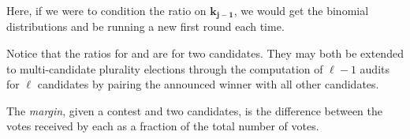 Here, if we were to condition the ratio on $\bm{k_{j-1}}$, we would get the binomial distributions and be running a new first round each time. 

Notice that the ratios for \BRAVO and \Minerva are for two candidates. They may both be extended to multi-candidate plurality elections through the computation of $\ell -1$ audits for $\ell$ candidates by pairing the announced winner with all other candidates. 

The {\em margin}, given a contest and two candidates, is the difference between the votes received by each as a fraction of the total number of votes. 

\begin{comment}
\begin{definition}[$ (\alpha, p, \bm{n_j} ) $-\Minerva]
     \label{def:minerva}
     Given \B $(\alpha, p)$-\BRAVO and cumulative round sizes\\ $\bm{n_j}$, the corresponding \R \Minerva stopping rule for the $j^{th}$ round is:
 \begin{equation}
     \mathcal{A}(X_{j})=  \left\{ \begin{array}{ll} \text{Correct} ~~~~ \tau_{j}(k_{j}, p_a, \frac{1}{2}, \bm{n_j}, \alpha ) \geq \frac{1}{\alpha}\\
             Undetermined ~~else \\
         \end{array}
         \right .
         \label{eqn:minerva-test}
 \end{equation}
\end{definition}
\end{comment}



